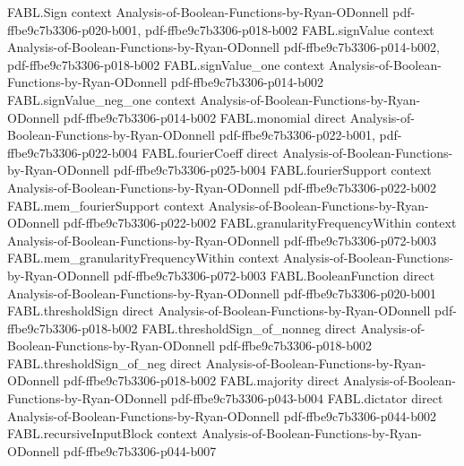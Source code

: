 \begin{theorem}
\label{FABL.dictator_monotone}
\leanok
{}
\proofstep
  {FABL.Sign}
  {context}
  {Analysis-of-Boolean-Functions-by-Ryan-ODonnell}
  {pdf-ffbe9c7b3306-p020-b001,
    pdf-ffbe9c7b3306-p018-b002}
\proofstep
  {FABL.signValue}
  {context}
  {Analysis-of-Boolean-Functions-by-Ryan-ODonnell}
  {pdf-ffbe9c7b3306-p014-b002,
    pdf-ffbe9c7b3306-p018-b002}
\proofstep
  {FABL.signValue_one}
  {context}
  {Analysis-of-Boolean-Functions-by-Ryan-ODonnell}
  {pdf-ffbe9c7b3306-p014-b002}
\proofstep
  {FABL.signValue_neg_one}
  {context}
  {Analysis-of-Boolean-Functions-by-Ryan-ODonnell}
  {pdf-ffbe9c7b3306-p014-b002}
\proofstep
  {FABL.monomial}
  {direct}
  {Analysis-of-Boolean-Functions-by-Ryan-ODonnell}
  {pdf-ffbe9c7b3306-p022-b001,
    pdf-ffbe9c7b3306-p022-b004}
\proofstep
  {FABL.fourierCoeff}
  {direct}
  {Analysis-of-Boolean-Functions-by-Ryan-ODonnell}
  {pdf-ffbe9c7b3306-p025-b004}
\proofstep
  {FABL.fourierSupport}
  {context}
  {Analysis-of-Boolean-Functions-by-Ryan-ODonnell}
  {pdf-ffbe9c7b3306-p022-b002}
\proofstep
  {FABL.mem_fourierSupport}
  {context}
  {Analysis-of-Boolean-Functions-by-Ryan-ODonnell}
  {pdf-ffbe9c7b3306-p022-b002}
\proofstep
  {FABL.granularityFrequencyWithin}
  {context}
  {Analysis-of-Boolean-Functions-by-Ryan-ODonnell}
  {pdf-ffbe9c7b3306-p072-b003}
\proofstep
  {FABL.mem_granularityFrequencyWithin}
  {context}
  {Analysis-of-Boolean-Functions-by-Ryan-ODonnell}
  {pdf-ffbe9c7b3306-p072-b003}
\proofstep
  {FABL.BooleanFunction}
  {direct}
  {Analysis-of-Boolean-Functions-by-Ryan-ODonnell}
  {pdf-ffbe9c7b3306-p020-b001}
\proofstep
  {FABL.thresholdSign}
  {direct}
  {Analysis-of-Boolean-Functions-by-Ryan-ODonnell}
  {pdf-ffbe9c7b3306-p018-b002}
\proofstep
  {FABL.thresholdSign_of_nonneg}
  {direct}
  {Analysis-of-Boolean-Functions-by-Ryan-ODonnell}
  {pdf-ffbe9c7b3306-p018-b002}
\proofstep
  {FABL.thresholdSign_of_neg}
  {direct}
  {Analysis-of-Boolean-Functions-by-Ryan-ODonnell}
  {pdf-ffbe9c7b3306-p018-b002}
\proofstep
  {FABL.majority}
  {direct}
  {Analysis-of-Boolean-Functions-by-Ryan-ODonnell}
  {pdf-ffbe9c7b3306-p043-b004}
\proofstep
  {FABL.dictator}
  {direct}
  {Analysis-of-Boolean-Functions-by-Ryan-ODonnell}
  {pdf-ffbe9c7b3306-p044-b002}
\proofstep
  {FABL.recursiveInputBlock}
  {context}
  {Analysis-of-Boolean-Functions-by-Ryan-ODonnell}
  {pdf-ffbe9c7b3306-p044-b007}
\proofstep

\end{theorem}

